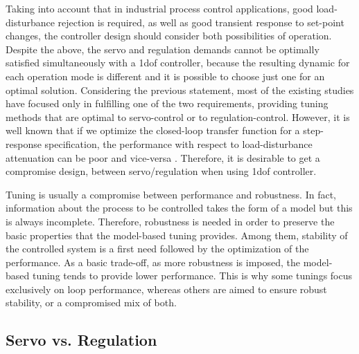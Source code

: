 Taking into account that in industrial process control applications, good load-disturbance rejection is required, as well as good transient response to set-point changes, the controller design should consider both possibilities of operation. Despite the above, the servo and regulation demands cannot be optimally satisfied simultaneously with a \gls{1dof} controller, because the resulting dynamic for each operation mode is different and it is possible to choose just one for an optimal solution. Considering the previous statement, most of the existing studies have focused only in fulfilling one of the two requirements, providing tuning methods that are optimal to servo-control or to regulation-control. However, it is well known that if we optimize the closed-loop transfer function for a step-response specification, the performance with respect to load-disturbance attenuation can be poor and vice-versa \citep{Arrieta2010a}. Therefore, it is desirable to get a compromise design, between servo/regulation when using \gls{1dof} controller.

Tuning is usually a compromise between performance and robustness. In fact, information about the process to be controlled takes the form of a model but this is always incomplete. Therefore, robustness is needed in order to preserve the basic properties that the model-based tuning provides. Among them, stability of the controlled system is a first need followed by the optimization of the performance. As a basic trade-off, as more robustness is imposed, the model-based tuning tends to provide lower performance. This is why some tunings focus exclusively on loop performance, whereas others are aimed to ensure robust stability, or a compromised mix of both. 

\subsection{Servo vs. Regulation}
%
 
